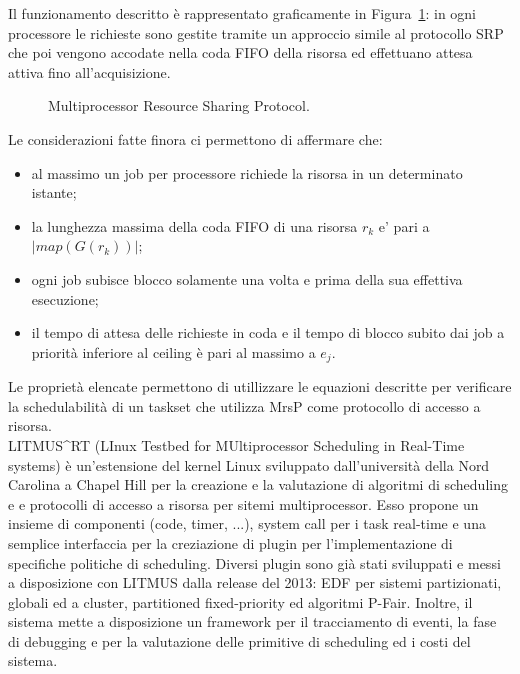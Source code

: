 Il funzionamento descritto è rappresentato graficamente in Figura~\ref{fig:locks.mrsp}: in ogni processore le richieste sono gestite tramite un approccio simile al protocollo SRP che poi vengono accodate nella coda FIFO della risorsa ed effettuano attesa attiva fino all'acquisizione.\\

\begin{figure}
\centering
{}
\caption{Multiprocessor Resource Sharing Protocol.}
\label{fig:locks.mrsp}
\end{figure}

Le considerazioni fatte finora ci permettono di affermare che:

\begin{itemize}
\item al massimo un job per processore richiede la risorsa in un determinato istante;
\item la lunghezza massima della coda FIFO di una risorsa $r_k$ e’ pari a $| map(G(r_k)) |$;
\item ogni job subisce blocco solamente una volta e prima della sua effettiva esecuzione;
\item il tempo di attesa delle richieste in coda e il tempo di blocco subito dai job a priorità inferiore al ceiling  è pari al massimo a $e_j$.
\end{itemize}

Le proprietà elencate permettono di utillizzare le equazioni descritte per verificare la schedulabilità di un taskset che utilizza MrsP come protocollo di accesso a risorsa.\\







LITMUS^RT (LInux Testbed for MUltiprocessor Scheduling in Real-Time systems) è un'estensione del kernel Linux sviluppato dall'università della Nord Carolina a Chapel Hill per la creazione e la valutazione di algoritmi di scheduling e e protocolli di accesso a risorsa per sitemi multiprocessor. Esso propone un insieme di componenti (code, timer, ...), system call per i task real-time e una semplice interfaccia per la creziazione di plugin per l'implementazione di specifiche politiche di scheduling. Diversi plugin sono già stati sviluppati e messi a disposizione con LITMUS dalla release del 2013: EDF per sistemi partizionati, globali ed a cluster, partitioned fixed-priority ed algoritmi P-Fair. Inoltre, il sistema mette a disposizione un framework per il tracciamento di eventi, la fase di debugging e per la valutazione delle primitive di scheduling ed i costi del sistema.

